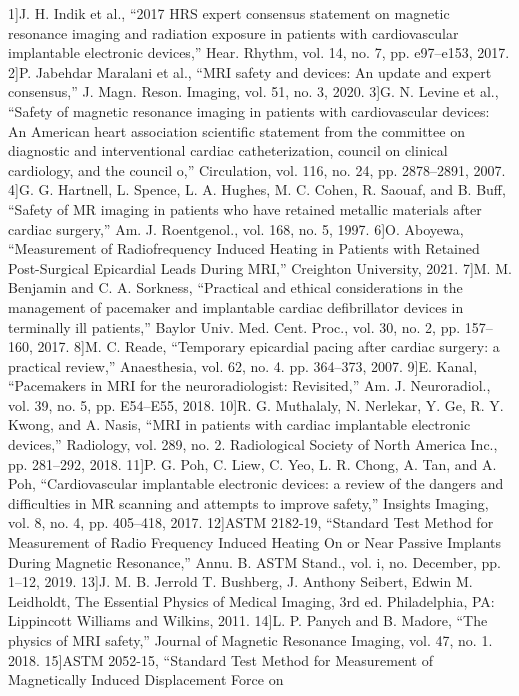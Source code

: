 1]J. H. Indik et al., “2017 HRS expert consensus statement on magnetic resonance imaging and radiation exposure
in patients with cardiovascular implantable electronic devices,” Hear. Rhythm, vol. 14, no. 7, pp. e97–e153, 2017.
2]P. Jabehdar Maralani et al., “MRI safety and devices: An update and expert consensus,” J. Magn. Reson. Imaging,
vol. 51, no. 3, 2020.
3]G. N. Levine et al., “Safety of magnetic resonance imaging in patients with cardiovascular devices: An American
heart association scientific statement from the committee on diagnostic and interventional cardiac
catheterization, council on clinical cardiology, and the council o,” Circulation, vol. 116, no. 24, pp. 2878–2891,
2007.
4]G. G. Hartnell, L. Spence, L. A. Hughes, M. C. Cohen, R. Saouaf, and B. Buff, “Safety of MR imaging in patients who
have retained metallic materials after cardiac surgery,” Am. J. Roentgenol., vol. 168, no. 5, 1997.
6]O. Aboyewa, “Measurement of Radiofrequency Induced Heating in Patients with Retained Post-Surgical
Epicardial Leads During MRI,” Creighton University, 2021.
7]M. M. Benjamin and C. A. Sorkness, “Practical and ethical considerations in the management of pacemaker and
implantable cardiac defibrillator devices in terminally ill patients,” Baylor Univ. Med. Cent. Proc., vol. 30, no. 2,
pp. 157–160, 2017.
8]M. C. Reade, “Temporary epicardial pacing after cardiac surgery: a practical review,” Anaesthesia, vol. 62, no. 4.
pp. 364–373, 2007.
9]E. Kanal, “Pacemakers in MRI for the neuroradiologist: Revisited,” Am. J. Neuroradiol., vol. 39, no. 5, pp. E54–E55,
2018.
10]R. G. Muthalaly, N. Nerlekar, Y. Ge, R. Y. Kwong, and A. Nasis, “MRI in patients with cardiac implantable electronic
devices,” Radiology, vol. 289, no. 2. Radiological Society of North America Inc., pp. 281–292, 2018.
11]P. G. Poh, C. Liew, C. Yeo, L. R. Chong, A. Tan, and A. Poh, “Cardiovascular implantable electronic devices: a
review of the dangers and difficulties in MR scanning and attempts to improve safety,” Insights Imaging, vol. 8,
no. 4, pp. 405–418, 2017.
12]ASTM 2182-19, “Standard Test Method for Measurement of Radio Frequency Induced Heating On or Near
Passive Implants During Magnetic Resonance,” Annu. B. ASTM Stand., vol. i, no. December, pp. 1–12, 2019.
13]J. M. B. Jerrold T. Bushberg, J. Anthony Seibert, Edwin M. Leidholdt, The Essential Physics of Medical Imaging, 3rd
ed. Philadelphia, PA: Lippincott Williams and Wilkins, 2011.
14]L. P. Panych and B. Madore, “The physics of MRI safety,” Journal of Magnetic Resonance Imaging, vol. 47, no. 1.
2018.
15]ASTM 2052-15, “Standard Test Method for Measurement of Magnetically Induced Displacement Force on
